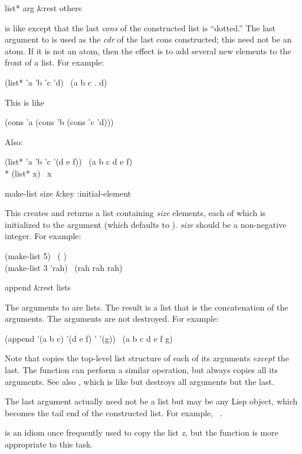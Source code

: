 \begin{defun}[Function]
list* arg &rest others

 is like  except that the last {\it cons}
of the constructed list is ``dotted.''  The last argument to 
is used as the {\it cdr} of the last cons constructed;
this need not be an atom.  If it is not an atom,
then the effect is to add several new elements to the front of a list.
For example:
\begin{lisp}
(list* 'a 'b 'c 'd) \EV\ (a b c . d)
\end{lisp}
This is like
\begin{lisp}
(cons 'a (cons 'b (cons 'c 'd)))
\end{lisp}
Also:
\begin{lisp}
(list* 'a 'b 'c '(d e f)) \EV\ (a b c d e f) \\*
(list* x) \EQ\ x
\end{lisp}
\end{defun}

\begin{defun}[Function]
make-list size &key :initial-element

This creates and returns a list containing {\it size} elements, each
of which is initialized to the 
argument (which defaults to {\false}).
{\it size} should be a non-negative integer.
For example:
\begin{lisp}
(make-list 5) \EV\ ({\false} {\false} {\false} {\false} {\false}) \\
(make-list 3  'rah) \EV\ (rah rah rah)
\end{lisp}
\end{defun}

\begin{defun}[Function]
append &rest lists

The arguments to  are lists.  The result is a list that is the
concatenation of the arguments.
The arguments are not destroyed.
For example:
\begin{lisp}
(append '(a b c) '(d e f) '{\empty} '(g)) \EV\ (a b c d e f g)
\end{lisp}
Note that  copies the top-level list structure of each of its
arguments {\it except} the last.
The function  can perform a similar operation, but always
copies all its arguments.  See also , which is like 
but destroys all arguments but the last.

The last argument actually need not be a list but may be any Lisp object,
which becomes the tail end of the constructed list.
For example,  \EV\ .

 is an idiom once frequently used to copy the
list {\it x}, but the  function is more appropriate to this
task.
\end{defun}

